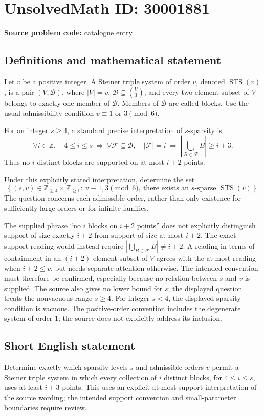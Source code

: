 \documentclass[11pt]{article}
\newcommand{\Z}{\mathbb{Z}}
\begin{document}
\section*{UnsolvedMath ID: 30001881}
\textbf{Source problem code:} catalogue entry
\subsection{Definitions and mathematical statement}
Let \(v\) be a positive integer. A Steiner triple system of order \(v\), denoted \(\operatorname{STS}(v)\), is a pair \((V,\mathcal B)\), where \(|V|=v\), \(\mathcal B\subseteq\binom{V}{3}\), and every two-element subset of \(V\) belongs to exactly one member of \(\mathcal B\). Members of \(\mathcal B\) are called blocks. Use the usual admissibility condition \(v\equiv1\) or \(3\pmod 6\).

For an integer \(s\geq4\), a standard precise interpretation of \(s\)-sparsity is
\[
 \forall i\in\Z,\quad 4\leq i\leq s\ \Longrightarrow\ \forall\mathcal F\subseteq\mathcal B,\quad
 |\mathcal F|=i\ \Longrightarrow\ \left|\bigcup_{B\in\mathcal F}B\right|\geq i+3.
\]
Thus no \(i\) distinct blocks are supported on at most \(i+2\) points.

Under this explicitly stated interpretation, determine the set
\[
 \left\{(s,v)\in\Z_{\geq4}\times\Z_{\geq1}:\ v\equiv1,3\pmod6,\ \text{there exists an }s\text{-sparse }\operatorname{STS}(v)\right\}.
\]
The question concerns each admissible order, rather than only existence for sufficiently large orders or for infinite families.

The supplied phrase ``no \(i\) blocks on \(i+2\) points'' does not explicitly distinguish support of size exactly \(i+2\) from support of size at most \(i+2\). The exact-support reading would instead require \(\left|\bigcup_{B\in\mathcal F}B\right|\neq i+2\). A reading in terms of containment in an \((i+2)\)-element subset of \(V\) agrees with the at-most reading when \(i+2\leq v\), but needs separate attention otherwise. The intended convention must therefore be confirmed, especially because no relation between \(s\) and \(v\) is supplied. The source also gives no lower bound for \(s\); the displayed question treats the nonvacuous range \(s\geq4\). For integer \(s<4\), the displayed sparsity condition is vacuous. The positive-order convention includes the degenerate system of order \(1\); the source does not explicitly address its inclusion.
\subsection{Short English statement}
Determine exactly which sparsity levels \(s\) and admissible orders \(v\) permit a Steiner triple system in which every collection of \(i\) distinct blocks, for \(4\leq i\leq s\), uses at least \(i+3\) points. This uses an explicit at-most-support interpretation of the source wording; the intended support convention and small-parameter boundaries require review.
\end{document}
